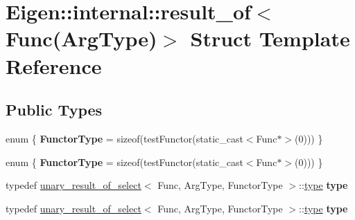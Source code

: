 \hypertarget{struct_eigen_1_1internal_1_1result__of_3_01_func_07_arg_type_08_4}{}\section{Eigen\+:\+:internal\+:\+:result\+\_\+of$<$ Func(Arg\+Type)$>$ Struct Template Reference}
\label{struct_eigen_1_1internal_1_1result__of_3_01_func_07_arg_type_08_4}
\subsection*{Public Types}
\begin{DoxyCompactItemize}
\item 
\mbox{\label{struct_eigen_1_1internal_1_1result__of_3_01_func_07_arg_type_08_4_a0f4cf3f9f243e20395d93b9d00cc6ab8}} 
enum \{ {\bfseries Functor\+Type} = sizeof(test\+Functor(static\+\_\+cast$<$Func$\ast$$>$(0)))
 \}
\item 
\mbox{\label{struct_eigen_1_1internal_1_1result__of_3_01_func_07_arg_type_08_4_abe27b25e3f32aea1b83071ff0a244e53}} 
enum \{ {\bfseries Functor\+Type} = sizeof(test\+Functor(static\+\_\+cast$<$Func$\ast$$>$(0)))
 \}
\item 
\mbox{\label{struct_eigen_1_1internal_1_1result__of_3_01_func_07_arg_type_08_4_ac23c3f75efcfbe8eee643401440fde84}} 
typedef \hyperlink{struct_eigen_1_1internal_1_1unary__result__of__select}{unary\+\_\+result\+\_\+of\+\_\+select}$<$ Func, Arg\+Type, Functor\+Type $>$\+::\hyperlink{group___sparse_core___module}{type} {\bfseries type}
\item 
\mbox{\label{struct_eigen_1_1internal_1_1result__of_3_01_func_07_arg_type_08_4_ac23c3f75efcfbe8eee643401440fde84}} 
typedef \hyperlink{struct_eigen_1_1internal_1_1unary__result__of__select}{unary\+\_\+result\+\_\+of\+\_\+select}$<$ Func, Arg\+Type, Functor\+Type $>$\+::\hyperlink{group___sparse_core___module}{type} {\bfseries type}
\end{DoxyCompactItemize}

